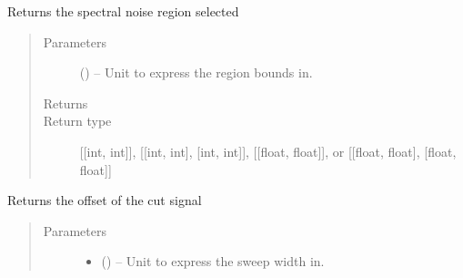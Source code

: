 \documentclass[letterpaper,10pt,english]{sphinxmanual}
\begin{document}
\begin{fulllineitems}
\begin{fulllineitems}
\label{\detokenize{references/freqfilter:nmrespy.freqfilter.FrequencyFilter.get_noise_region}}
\sphinxAtStartPar
Returns the spectral noise region selected
\begin{quote}\begin{description}
\item[{Parameters}] \leavevmode
\sphinxAtStartPar
{} (\sphinxstyleliteralemphasis{\sphinxupquote{, }}\sphinxstyleliteralemphasis{\sphinxupquote{, }}\sphinxstyleliteralemphasis{\sphinxupquote{, }}) – Unit to express the region bounds in.

\item[{Returns}] \leavevmode
\sphinxAtStartPar
{}

\item[{Return type}] \leavevmode
\sphinxAtStartPar
{[}{[}int, int{]}{]}, {[}{[}int, int{]}, {[}int, int{]}{]},        {[}{[}float, float{]}{]}, or {[}{[}float, float{]}, {[}float, float{]}{]}

\end{description}\end{quote}

\end{fulllineitems}


\begin{fulllineitems}
\label{\detokenize{references/freqfilter:nmrespy.freqfilter.FrequencyFilter.get_offset}}
\sphinxAtStartPar
Returns the offset of the cut signal
\begin{quote}\begin{description}
\item[{Parameters}] \leavevmode\begin{itemize}
\item {} 
\sphinxAtStartPar
{} (\sphinxstyleliteralemphasis{\sphinxupquote{, }}\sphinxstyleliteralemphasis{\sphinxupquote{, }}) – Unit to express the sweep width in.


\end{itemize}
\end{description}
\end{quote}
\end{fulllineitems}
\end{fulllineitems}
\end{document}
